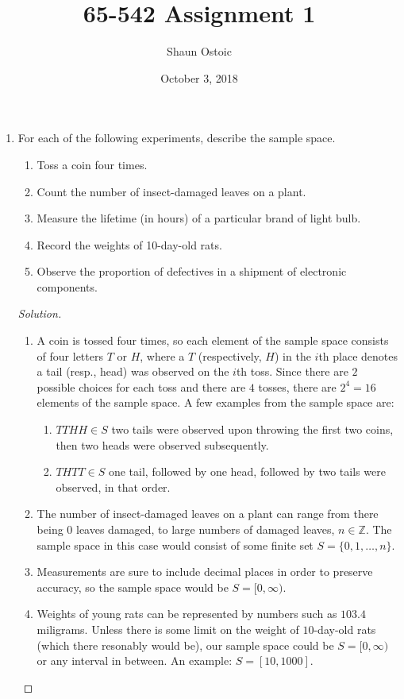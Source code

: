 \documentclass[12pt]{article}
\theoremstyle{definition}
\theoremstyle{plain}
\newenvironment{solution}
  {\begin{proof}[Solution]}
  {\end{proof}}
\begin{document}
\baselineskip 18pt
  
\title{65-542 Assignment 1}

\author{Shaun Ostoic}
\date{October 3, 2018}

\maketitle

\begin{enumerate}
\item For each of the following experiments, describe the sample space. 
\begin{enumerate}
\item Toss a coin four times.
\item Count the number of insect-damaged leaves on a plant.
\item Measure the lifetime (in hours) of a particular brand of light bulb.
\item Record the weights of 10-day-old rats.
\item Observe the proportion of defectives in a shipment of electronic components.
\end{enumerate}
\begin{solution}
\begin{enumerate}
	\item A coin is tossed four times, so each element of the sample space consists of four letters $ T $ or $ H $, where a $ T $ (respectively, $ H $) in the $ i $th place denotes a tail (resp., head) was observed on the $ i $th toss. Since there are $ 2 $ possible choices for each toss and there are $ 4 $ tosses, there are $ 2^4 = 16 $ elements of the sample space. A few examples from the sample space are:
		\begin{enumerate}
		\item $ TTHH \in S $ two tails were observed upon throwing the first two coins, then two heads were observed subsequently.
		\item $ THTT \in S$ one tail, followed by one head, followed by two tails were observed, in that order.
		\end{enumerate}
	\item The number of insect-damaged leaves on a plant can range from there being $ 0 $ leaves damaged, to large numbers of damaged leaves, $ n \in \mathbb{Z} $. The sample space in this case would consist of some finite set $ S = \{ 0, 1, \ldots, n \} $.
	
	\item Measurements are sure to include decimal places in order to preserve accuracy, so the sample space would be $ S = [0, \infty) $.
	\item Weights of young rats can be represented by numbers such as $ 103.4 $ miligrams. Unless there is some limit on the weight of $ 10 $-day-old rats (which there resonably would be), our sample space could be $ S = [0, \infty) $ or any interval in between. An example: $ S = [10, 1000] $.
	

\end{enumerate}
\end{solution}
\end{enumerate}
\end{document}
